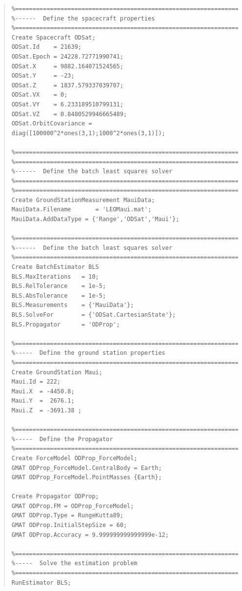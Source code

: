 \begin{quote}
\begin{verbatim}
%==========================================================================
%------  Define the spacecraft properties
%==========================================================================
Create Spacecraft ODSat;
ODSat.Id    = 21639;
ODSat.Epoch = 24228.72771990741;
ODSat.X     = 9882.164071524565;
ODSat.Y     = -23;
ODSat.Z     = 1837.579337039707;
ODSat.VX    = 0;
ODSat.VY    = 6.233189510799131;
ODSat.VZ    = 0.8480529946665489;
ODSat.OrbitCovariance = diag([100000^2*ones(3,1);1000^2*ones(3,1)]);

%==========================================================================
%==========================================================================
%------  Define the batch least squares solver
%==========================================================================
%==========================================================================
Create GroundStationMeasurement MauiData;
MauiData.Filename       = 'LEOMaui.mat';
MauiData.AddDataType = {'Range','ODSat','Maui'};

%==========================================================================
%------  Define the batch least squares solver
%==========================================================================
Create BatchEstimator BLS
BLS.MaxIterations   = 10;
BLS.RelTolerance    = 1e-5;
BLS.AbsTolerance    = 1e-5;
BLS.Measurements    = {'MauiData'};
BLS.SolveFor        = {'ODSat.CartesianState'};
BLS.Propagator      = 'ODProp';

%==========================================================================
%-----  Define the ground station properties
%==========================================================================
Create GroundStation Maui;
Maui.Id = 222;
Maui.X  = -4450.8;
Maui.Y  =  2676.1;
Maui.Z  = -3691.38 ;

%==========================================================================
%-----  Define the Propagator
%==========================================================================
Create ForceModel ODProp_ForceModel;
GMAT ODProp_ForceModel.CentralBody = Earth;
GMAT ODProp_ForceModel.PointMasses {Earth};

Create Propagator ODProp;
GMAT ODProp.FM = ODProp_ForceModel;
GMAT ODProp.Type = RungeKutta89;
GMAT ODProp.InitialStepSize = 60;
GMAT ODProp.Accuracy = 9.999999999999999e-12;

%==========================================================================
%-----  Solve the estimation problem
%==========================================================================
RunEstimator BLS;
\end{verbatim}
\end{quote}

